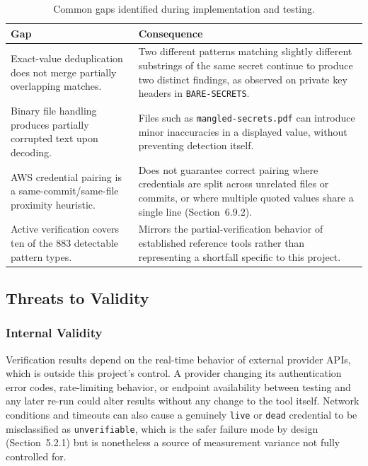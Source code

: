 \documentclass[12pt]{article}
\begin{document}
\begin{table}[h]
\centering
\begin{tabularx}{\textwidth}{|p{}|Y|}
\hline
\textbf{Gap} & \textbf{Consequence} \\
\hline
Exact-value deduplication does not merge partially overlapping matches. & Two different patterns matching slightly different substrings of the same secret continue to produce two distinct findings, as observed on private key headers in \texttt{BARE-SECRETS}. \\
Binary file handling produces partially corrupted text upon decoding. & Files such as \texttt{mangled-secrets.pdf} can introduce minor inaccuracies in a displayed value, without preventing detection itself. \\
AWS credential pairing is a same-commit/same-file proximity heuristic. & Does not guarantee correct pairing where credentials are split across unrelated files or commits, or where multiple quoted values share a single line (Section~6.9.2). \\
Active verification covers ten of the 883 detectable pattern types. & Mirrors the partial-verification behavior of established reference tools rather than representing a shortfall specific to this project. \\
\hline
\end{tabularx}
\caption{Common gaps identified during implementation and testing.}
\label{tab:identified-gaps}
\end{table}

\subsection{Threats to Validity}

\subsubsection*{Internal Validity}

Verification results depend on the real-time behavior of external provider APIs, which is outside this project's control. A provider changing its authentication error codes, rate-limiting behavior, or endpoint availability between testing and any later re-run could alter results without any change to the tool itself. Network conditions and timeouts can also cause a genuinely \texttt{live} or \texttt{dead} credential to be misclassified as \texttt{unverifiable}, which is the safer failure mode by design (Section~5.2.1) but is nonetheless a source of measurement variance not fully controlled for.
\end{document}
